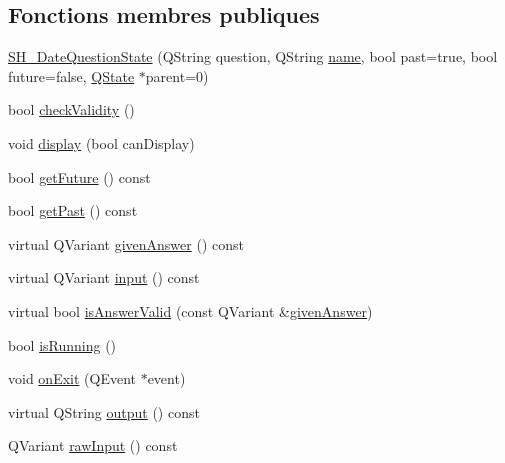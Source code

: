 \subsection*{Fonctions membres publiques}
\begin{DoxyCompactItemize}
\item 
\hyperlink{classSimpleHotel_1_1SH__DateQuestionState_ac2941e20440552628522b2ae6c194b61}{S\-H\-\_\-\-Date\-Question\-State} (Q\-String question, Q\-String \hyperlink{classSimpleHotel_1_1SH__NamedObject_ad144716345034c91cface8f3163a799e}{name}, bool past=true, bool future=false, \hyperlink{classQState}{Q\-State} $\ast$parent=0)
\item 
bool \hyperlink{classSimpleHotel_1_1SH__QuestionState_a0fd7e76443cfd6f0329b085358e30355}{check\-Validity} ()
\item 
void \hyperlink{classSimpleHotel_1_1SH__InOutState_a1cbe5befe4f42e0941165498ed0117a9}{display} (bool can\-Display)
\item 
bool \hyperlink{classSimpleHotel_1_1SH__DateQuestionState_a5b9defa1f41f657e9a9a38171ac5666a}{get\-Future} () const 
\item 
bool \hyperlink{classSimpleHotel_1_1SH__DateQuestionState_a96bbc5443174d80117b3ab9b5947fd8d}{get\-Past} () const 
\item 
virtual Q\-Variant \hyperlink{classSimpleHotel_1_1SH__QuestionState_a243f09bc1f822af7748edb038ac2957c}{given\-Answer} () const 
\item 
virtual Q\-Variant \hyperlink{classSimpleHotel_1_1SH__InOutState_a487d2ca6200fed372b1a27cfa27774db}{input} () const 
\item 
virtual bool \hyperlink{classSimpleHotel_1_1SH__DateQuestionState_a991fbb7c26a414d054780cd9a1e2221f}{is\-Answer\-Valid} (const Q\-Variant \&\hyperlink{classSimpleHotel_1_1SH__QuestionState_a243f09bc1f822af7748edb038ac2957c}{given\-Answer})
\item 
bool \hyperlink{classSimpleHotel_1_1SH__GenericState_a5151ff071129bdd4dcf7c60cb93794da}{is\-Running} ()
\item 
void \hyperlink{classSimpleHotel_1_1SH__InOutState_aa5fc1b9281087bd8abcd6873d2a36009}{on\-Exit} (Q\-Event $\ast$event)
\item 
virtual Q\-String \hyperlink{classSimpleHotel_1_1SH__InOutState_a71b15e4d49b9c2aa540500065ceb39da}{output} () const 
\item 
Q\-Variant \hyperlink{classSimpleHotel_1_1SH__DateQuestionState_adb8becb2b3f9c9c38da757dbcea95554}{raw\-Input} () const 
\item 

\end{DoxyCompactItemize}
